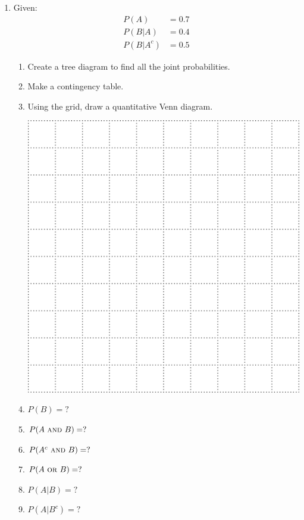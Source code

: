 \documentclass[12pt,letterpaper]{article}
\begin{document}
\begin{enumerate}
\item Given:
\begin{align*}
P(A) &= 0.7 \\
P(B|A) &= 0.4 \\
P(B|A^c) &= 0.5
\end{align*}
\begin{enumerate}
\item Create a tree diagram to find all the joint probabilities.
\vfill
\item Make a contingency table.
\vfill
\newpage
\item Using the grid, draw a quantitative Venn diagram.
\begin{center}
\includegraphics[scale=0.9]{figures/grid.png}
\end{center}
\item $P(B)= ?$
\vfill
\item $P(A ~\textsc{and}~B) = ?$
\vfill
\item $P(A^c ~\textsc{and}~B) = ?$
\vfill
\item $P(A ~\textsc{or}~B) = ?$
\vfill
\item $P(A|B) = ?$
\vfill
\item $P(A|B^c) = ?$
\vfill

\end{enumerate}
\end{enumerate}
\end{document}
